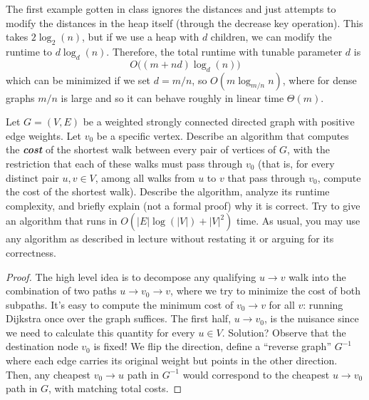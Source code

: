   The first example gotten in class ignores the distances and just attempts to modify the distances in the heap itself (through the decrease key operation). This takes $2 \log_2 (n)$, but if we use a heap with $d$ children, we can modify the runtime to $d \log_d (n)$. Therefore, the total runtime with tunable parameter $d$ is 
  \begin{equation}
    O\big( (m + nd) \log_d (n)\big)
  \end{equation}
  which can be minimized if we set $d = m/n$, so $O(m \log_{m/n} n)$, where for dense graphs $m/n$ is large and so it can behave roughly in linear time $\Theta(m)$. 

  \begin{exercise}
    Let $G = (V,E)$ be a weighted strongly connected directed graph with positive edge weights. Let $v_0$ be a specific vertex. Describe an algorithm that computes the \textbf{\textit{cost}} of the shortest walk between every pair of vertices of $G$, with the restriction that each of these walks must pass through $v_0$ (that is, for every distinct pair $u, v \in V$, among all walks from $u$ to $v$ that pass through $v_0$, compute the cost of the shortest walk). Describe the algorithm, analyze its runtime complexity, and briefly explain (not a formal proof) why it is correct. Try to give an algorithm that runs in $O (|E|\log(|V|) + |V|^2)$ time. As usual, you may use any algorithm as described in lecture without restating it or arguing for its correctness.
  \end{exercise}
  \begin{proof}
    The high level idea is to decompose any qualifying $u\to v$ walk into the combination of two paths $u\to v_0\to v$, where we try to minimize the cost of both subpaths. It's easy to compute the minimum cost of $v_0\to v$ for all $v$: running Dijkstra once over the graph suffices. The first half, $u\to v_0$, is the nuisance since we need to calculate this quantity for every $u\in V$. Solution? Observe that the destination node $v_0$ is fixed! We flip the direction, define a ``reverse graph'' $G^{-1}$ where each edge carries its original weight but points in the other direction. Then, any cheapest $v_0\to u$ path in $G^{-1}$ would correspond to the cheapest $u\to v_0$ path in $G$, with matching total costs.  
  \end{proof}

